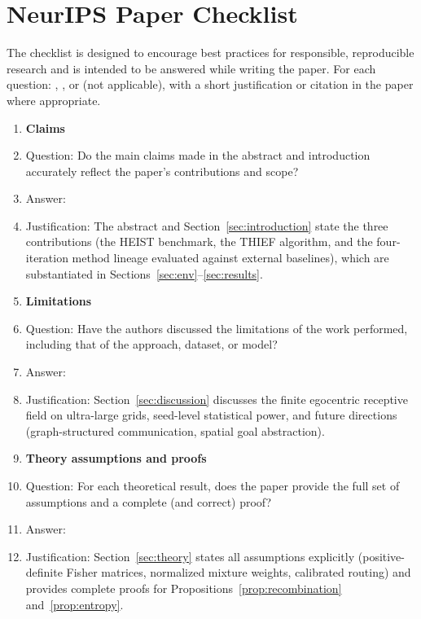 \section*{NeurIPS Paper Checklist}

The checklist is designed to encourage best practices for responsible, reproducible research and is intended to be answered while writing the paper. For each question: \answerYes{}, \answerNo{}, or \answerNA{} (not applicable), with a short justification or citation in the paper where appropriate.

\begin{enumerate}

\item {\bf Claims}
    \item[] Question: Do the main claims made in the abstract and introduction accurately reflect the paper's contributions and scope?
    \item[] Answer: \answerYes{}
    \item[] Justification: The abstract and Section~\ref{sec:introduction} state the three contributions (the HEIST benchmark, the THIEF algorithm, and the four-iteration method lineage evaluated against external baselines), which are substantiated in Sections~\ref{sec:env}--\ref{sec:results}.

\item {\bf Limitations}
    \item[] Question: Have the authors discussed the limitations of the work performed, including that of the approach, dataset, or model?
    \item[] Answer: \answerYes{}
    \item[] Justification: Section~\ref{sec:discussion} discusses the finite egocentric receptive field on ultra-large grids, seed-level statistical power, and future directions (graph-structured communication, spatial goal abstraction).

\item {\bf Theory assumptions and proofs}
    \item[] Question: For each theoretical result, does the paper provide the full set of assumptions and a complete (and correct) proof?
    \item[] Answer: \answerYes{}
    \item[] Justification: Section~\ref{sec:theory} states all assumptions explicitly (positive-definite Fisher matrices, normalized mixture weights, calibrated routing) and provides complete proofs for Propositions~\ref{prop:recombination} and~\ref{prop:entropy}.


\end{enumerate}

